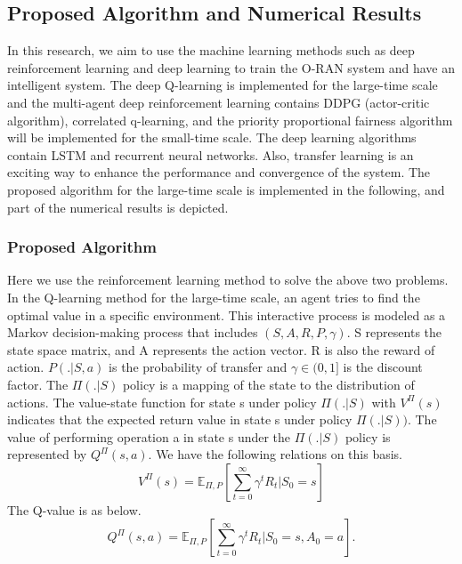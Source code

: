 \documentclass{article}
\begin{document}
\subsection{Proposed Algorithm and Numerical Results}
In this research, we aim to use the machine learning methods such as deep reinforcement learning and deep learning to train the O-RAN system and have an intelligent system.
The deep Q-learning is implemented for the large-time scale and 
 the multi-agent deep reinforcement learning contains DDPG (actor-critic algorithm), correlated q-learning, and the priority proportional fairness algorithm will be implemented for the small-time scale. 
The deep learning algorithms contain LSTM and recurrent neural networks. Also, transfer learning is an exciting way to enhance the performance and convergence of the system.
The proposed algorithm for the large-time scale is implemented in the following, and part of the numerical results is depicted.
\subsubsection{Proposed Algorithm}
Here we use the reinforcement learning method to solve the above two problems.
In the Q-learning method for the large-time scale, an agent tries to find the optimal value in a specific environment. This interactive process is modeled as a Markov decision-making process that includes $ (S, A, R, P, \gamma) $.
S represents the state space matrix, and A represents the action vector. R is also the reward of action. $ P (. | S, a) $ is the probability of transfer and $ \gamma \in (0,1] $ is the discount factor.  The $ \Pi (. | S) $ policy is a mapping of the state to the distribution of actions. The value-state function for state s under policy $ \Pi (. | S) $ with $ V^{\Pi} (s) $ indicates that the expected return value in state s under policy $ \Pi (. | S) ) $. The value of performing operation a in state s under the $ \Pi (. | S) $ policy is represented by $ Q ^ {\Pi} (s, a) $. We have the following relations on this basis.
\begin{equation}
	V^{\Pi}(s) = \mathbb{E}_{\Pi,P}[\sum_{t=0}^{\infty}\gamma^tR_t|S_0=s]
 \end{equation}
 The Q-value is as below.
 \begin{equation}
	Q^{\Pi}(s,a) = \mathbb{E}_{\Pi,P}[\sum_{t=0}^{\infty}\gamma^tR_t|S_0=s,A_0=a].
\end{equation}
 
\end{document}
